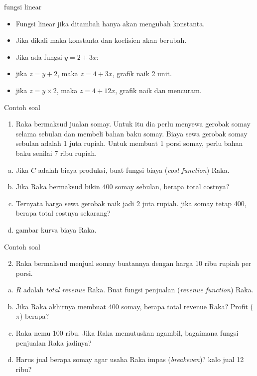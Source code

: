 \documentclass[
  ignorenonframetext,
]{beamer}
\providecommand{\tightlist}{%
  \setlength{\itemsep}{0pt}\setlength{\parskip}{0pt}}\usepackage{longtable,booktabs,array}
\begin{document}
\begin{frame}{fungsi linear}
\label{fungsi-linear-3}
\begin{itemize}
\item
  Fungsi linear jika ditambah hanya akan mengubah konstanta.
\item
  Jika dikali maka konstanta dan koefisien akan berubah.
\item
  Jika ada fungsi \(y=2+3x\):
\item
  jika \(z=y+2\), maka \(z=4+3x\), grafik naik 2 unit.
\item
  jika \(z=y \times 2\), maka \(z=4+12x\), grafik naik dan mencuram.
\end{itemize}
\end{frame}

\begin{frame}{Contoh soal}
\label{contoh-soal-1}
\begin{enumerate}
\tightlist
\item
  Raka bermaksud jualan somay. Untuk itu dia perlu menyewa gerobak somay
  selama sebulan dan membeli bahan baku somay. Biaya sewa gerobak somay
  sebulan adalah 1 juta rupiah. Untuk membuat 1 porsi somay, perlu bahan
  baku senilai 7 ribu rupiah.
\end{enumerate}

\begin{enumerate}
[a.]
\tightlist
\item
  Jika \(C\) adalah biaya produksi, buat fungsi biaya (\emph{cost
  function}) Raka.
\item
  Jika Raka bermaksud bikin 400 somay sebulan, berapa total costnya?
\item
  Ternyata harga sewa gerobak naik jadi 2 juta rupiah. jika somay tetap
  400, berapa total costnya sekarang?
\item
  gambar kurva biaya Raka.
\end{enumerate}
\end{frame}

\begin{frame}{Contoh soal}
\label{contoh-soal-2}
\begin{enumerate}
\setcounter{enumi}{1}
\tightlist
\item
  Raka bermaksud menjual somay buatannya dengan harga 10 ribu rupiah per
  porsi.
\end{enumerate}

\begin{enumerate}
[a.]
\tightlist
\item
  \(R\) adalah \emph{total revenue} Raka. Buat fungsi penjualan
  (\emph{revenue function}) Raka.
\item
  Jika Raka akhirnya membuat 400 somay, berapa total revenue Raka?
  Profit (\(\pi\)) berapa?
\item
  Raka nemu 100 ribu. Jika Raka memutuskan ngambil, bagaimana fungsi
  penjualan Raka jadinya?
\item
  Harus jual berapa somay agar usaha Raka impas (\emph{breakeven})? kalo
  jual 12 ribu?
\end{enumerate}
\end{frame}
\end{document}
